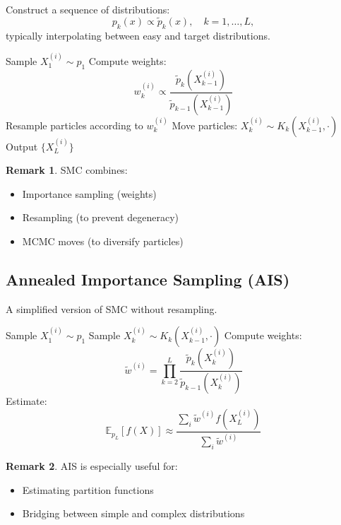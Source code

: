 \documentclass[12pt,oneside]{book}
\numberwithin{equation}{section}
\theoremstyle{definition}
\newtheorem{remark}{Remark}[section]
\theoremstyle{plain}
\theoremstyle{remark}
\newcommand{\E}{\mathbb{E}}
\begin{document}
Construct a sequence of distributions:
\[
p_k(x) \propto \tilde p_k(x), \quad k = 1,\dots,L,
\]
typically interpolating between easy and target distributions.

\begin{algorithm}[H]
\caption{Sequential Monte Carlo}
\begin{algorithmic}[1]
\State Sample $X_1^{(i)} \sim p_1$
    \State Compute weights:
    \[
    w_k^{(i)} \propto \frac{\tilde p_k(X_{k-1}^{(i)})}{\tilde p_{k-1}(X_{k-1}^{(i)})}
    \]
    \State Resample particles according to $w_k^{(i)}$
    \State Move particles: $X_k^{(i)} \sim K_k(X_{k-1}^{(i)}, \cdot)$
\EndFor
\State Output $\{X_L^{(i)}\}$
\end{algorithmic}
\end{algorithm}

\begin{remark}
SMC combines:
\begin{itemize}
    \item Importance sampling (weights)
    \item Resampling (to prevent degeneracy)
    \item MCMC moves (to diversify particles)
\end{itemize}
\end{remark}

\subsection{Annealed Importance Sampling (AIS)}

A simplified version of SMC without resampling.

\begin{algorithm}[H]
\caption{Annealed Importance Sampling}
\begin{algorithmic}[1]
\State Sample $X_1^{(i)} \sim p_1$
    \State Sample $X_k^{(i)} \sim K_k(X_{k-1}^{(i)}, \cdot)$
\EndFor
\State Compute weights:
\[
\tilde w^{(i)} = \prod_{k=2}^L \frac{\tilde p_k(X_k^{(i)})}{\tilde p_{k-1}(X_k^{(i)})}
\]
\State Estimate:
\[
\E_{p_L}[f(X)] \approx \frac{\sum_i \tilde w^{(i)} f(X_L^{(i)})}{\sum_i \tilde w^{(i)}}
\]
\end{algorithmic}
\end{algorithm}

\begin{remark}
AIS is especially useful for:
\begin{itemize}
    \item Estimating partition functions
    \item Bridging between simple and complex distributions
\end{itemize}
\end{remark}
\end{document}
